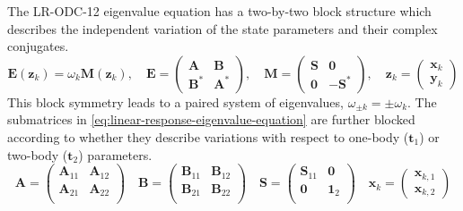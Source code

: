 The LR-ODC-12 eigenvalue equation has a two-by-two block structure which
describes the independent variation of the state parameters and their complex
conjugates.
\begin{equation}
    \label{eq:linear-response-eigenvalue-equation}
    \mathbf{E}(\mathbf{z}_k)
    =
    \omega_k
    \mathbf{M}(\mathbf{z}_k)
    ,
    \quad
    \mathbf{E}
    =
    \begin{pmatrix}
        \mathbf{A} & \mathbf{B} \\
        \mathbf{B}^* & \mathbf{A}^*
    \end{pmatrix}
    ,
    \quad
    \mathbf{M}
    =
    \begin{pmatrix}
        \mathbf{S} & \mathbf{0} \\
        \mathbf{0} & -\mathbf{S}^*
    \end{pmatrix}
    ,
    \quad
    \mathbf{z}_k
    =
    \begin{pmatrix}
        \mathbf{x}_k \\
        \mathbf{y}_k
    \end{pmatrix}
\end{equation}
This block symmetry leads to a paired system of eigenvalues,
\(
    \omega_{\pm k}
    =
    \pm\omega_k
\).
The submatrices in \cref{eq:linear-response-eigenvalue-equation} are further
blocked according to whether they describe variations with respect to one-body
(\(\mathbf{t}_1\)) or two-body (\(\mathbf{t}_2\)) parameters.
\begin{equation}
    \label{eq:conjugate-blocks}
    \mathbf{A}
    =
    \begin{pmatrix}
        \mathbf{A}_{11} & \mathbf{A}_{12} \\
        \mathbf{A}_{21} & \mathbf{A}_{22} \\
    \end{pmatrix}
    \quad
    \mathbf{B}
    =
    \begin{pmatrix}
        \mathbf{B}_{11} & \mathbf{B}_{12} \\
        \mathbf{B}_{21} & \mathbf{B}_{22} \\
    \end{pmatrix}
    \quad
    \mathbf{S}
    =
    \begin{pmatrix}
        \mathbf{S}_{11} & \mathbf{0} \\
        \mathbf{0} & \mathbf{1}_2 \\
    \end{pmatrix}
    \quad
    \mathbf{x}_k
    =
    \begin{pmatrix}
        \mathbf{x}_{k,1} \\
        \mathbf{x}_{k,2}
    \end{pmatrix}
\end{equation}
